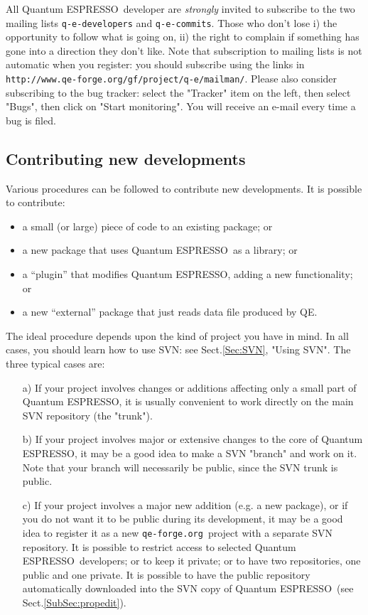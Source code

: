 \documentclass[12pt,a4paper]{article}
\def\qe{{\sc Quantum ESPRESSO}}
\def\qeforge{\texttt{qe-forge.org}}
\begin{document}
All \qe\ developer are {\em strongly} invited to subscribe to the 
two mailing lists \texttt{q-e-developers} and \texttt{q-e-commits}.
Those who don't lose i) the opportunity to follow what is going on,
ii) the right to complain if something has gone into a direction 
they don't like. Note that subscription to mailing lists is not 
automatic when you register: you should subscribe using the links 
in \texttt{http://www.qe-forge.org/gf/project/q-e/mailman/}.
Please also consider subscribing to the bug tracker: select the
"Tracker" item on the left, then select "Bugs", then click on
"Start monitoring". You will receive an e-mail every time a
bug is filed.

\subsection{Contributing new developments}

Various procedures can be followed to contribute new developments.
It is possible to contribute:
\begin{itemize}
\item a small (or large) piece of code to an existing package; or
\item a new package that uses \qe\ as a library; or
\item a ``plugin'' that modifies \qe, adding a new functionality; or
\item a new ``external'' package that just reads data file produced by QE.
\end{itemize}
The ideal procedure depends upon the kind of project you have in
mind. In all cases, you should learn how to use SVN: see Sect.\ref{Sec:SVN}, 
"Using SVN". The three typical cases are:
\begin{itemize}
\item[a)] If your project involves changes or additions affecting only 
a small part of \qe, it is usually convenient to work directly on 
the main SVN repository (the "trunk").
\item[b)] 
If your project involves major or extensive changes to the core of
\qe, it may be a good idea to make a SVN "branch" and work on it.
Note that your branch will necessarily be public, since the SVN
trunk is public.
\item[c)]
If your project involves a major new addition (e.g. a new package),
or if you do not want it to be public during its development,
it may be a good idea to register it as a new \qeforge\ project
with a separate SVN repository. It is possible to restrict access
to selected \qe\ developers; or to keep it private; or to have
two repositories, one public and one private. It is possible to 
have the public repository automatically downloaded into the
SVN copy of \qe\ (see Sect.\ref{SubSec:propedit}).

\end{itemize}
\end{document}
